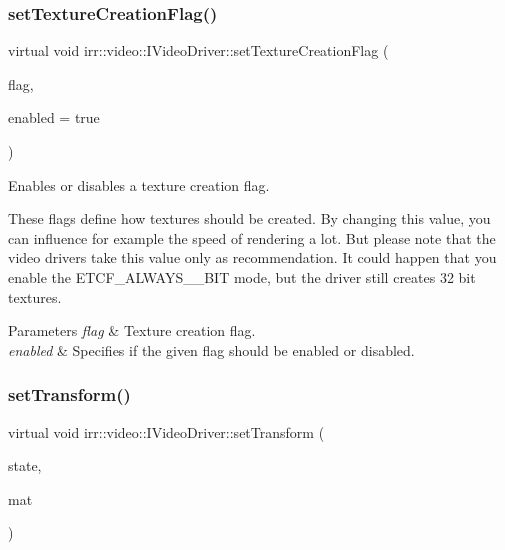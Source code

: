 \subsubsection{\texorpdfstring{set\+Texture\+Creation\+Flag()}{setTextureCreationFlag()}}
{\footnotesize\ttfamily virtual void irr\+::video\+::\+I\+Video\+Driver\+::set\+Texture\+Creation\+Flag (\begin{DoxyParamCaption}\item[{\hyperlink{namespaceirr_1_1video_acaf6f7414534f7d62bff18c5bf11876f}{E\+\_\+\+T\+E\+X\+T\+U\+R\+E\+\_\+\+C\+R\+E\+A\+T\+I\+O\+N\+\_\+\+F\+L\+AG}}]{flag,  }\item[{bool}]{enabled = {\ttfamily true} }\end{DoxyParamCaption})\hspace{0.3cm}{\ttfamily [pure virtual]}}



Enables or disables a texture creation flag. 

These flags define how textures should be created. By changing this value, you can influence for example the speed of rendering a lot. But please note that the video drivers take this value only as recommendation. It could happen that you enable the E\+T\+C\+F\+\_\+\+A\+L\+W\+A\+Y\+S\+\_\+\_\+\+B\+IT mode, but the driver still creates 32 bit textures. 
\begin{DoxyParams}{Parameters}
{\em flag} & Texture creation flag. \\
\hline
{\em enabled} & Specifies if the given flag should be enabled or disabled. \\
\hline
\end{DoxyParams}
\mbox{\label{classirr_1_1video_1_1IVideoDriver_aaf6e88bedf7b91666a2bd34f46e092fc}} 
\subsubsection{\texorpdfstring{set\+Transform()}{setTransform()}}
{\footnotesize\ttfamily virtual void irr\+::video\+::\+I\+Video\+Driver\+::set\+Transform (\begin{DoxyParamCaption}\item[{\hyperlink{namespaceirr_1_1video_a15b57657a320243be03ae6f66fcff43d}{E\+\_\+\+T\+R\+A\+N\+S\+F\+O\+R\+M\+A\+T\+I\+O\+N\+\_\+\+S\+T\+A\+TE}}]{state,  }\item[{const \hyperlink{namespaceirr_1_1core_a73fa92e638c5ca97efd72da307cc9b65}{core\+::matrix4} \&}]{mat }\end{DoxyParamCaption})\hspace{0.3cm}{\ttfamily [pure virtual]}}



